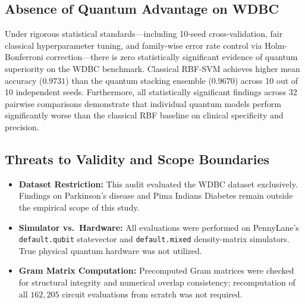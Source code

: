 \subsection{Absence of Quantum Advantage on WDBC}
Under rigorous statistical standards—including 10-seed cross-validation, fair classical hyperparameter tuning, and family-wise error rate control via Holm-Bonferroni correction—there is zero statistically significant evidence of quantum superiority on the WDBC benchmark. Classical RBF-SVM achieves higher mean accuracy ($0.9731$) than the quantum stacking ensemble ($0.9670$) across 10 out of 10 independent seeds. Furthermore, all statistically significant findings across 32 pairwise comparisons demonstrate that individual quantum models perform significantly worse than the classical RBF baseline on clinical specificity and precision.

\subsection{Threats to Validity and Scope Boundaries}
\begin{itemize}[leftmargin=*]
  \item \textbf{Dataset Restriction:} This audit evaluated the WDBC dataset exclusively. Findings on Parkinson's disease and Pima Indians Diabetes remain outside the empirical scope of this study.
  \item \textbf{Simulator vs.\ Hardware:} All evaluations were performed on PennyLane's \texttt{default.qubit} statevector and \texttt{default.mixed} density-matrix simulators. True physical quantum hardware was not utilized.
  \item \textbf{Gram Matrix Computation:} Precomputed Gram matrices were checked for structural integrity and numerical overlap consistency; recomputation of all $162{,}205$ circuit evaluations from scratch was not required.
\end{itemize}
